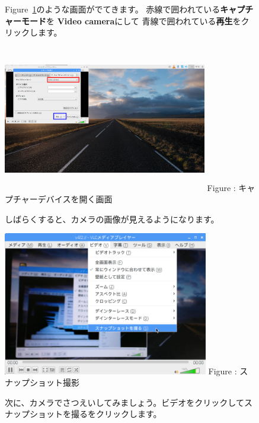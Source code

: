 \documentclass[a4paper,12pt]{jarticle}
\begin{document}
\begin{figure}[ht]
  Figure~\ref{seq:refFigure23}のような画面がでてきます。
  赤線で囲われている\textbf{キャプチャーモード}を
  \textbf{Video camera}にして
  青線で囲われている\textbf{再生}をクリックします。


  \centering
  \begin{minipage}{9.119cm}
    \includegraphics[width=8.915cm,height=6.426cm]{textbook-img117.png}
    Figure {\theFigure\label{seq:refFigure23}}:
    キャプチャーデバイスを開く画面
  \end{minipage}

  \flushleft
  しばらくすると、カメラの画像が見えるようになります。

  \centering
  \begin{minipage}{9.125cm}
    {\upshape
      \includegraphics[width=8.966cm,height=6.274cm]{textbook-img118.png}
      \newline
      Figure : スナップショット撮影}
  \end{minipage}
  \flushleft

  次に、カメラでさつえいしてみましょう。ビデオをクリックしてスナップショットを撮るをクリックします。



\end{figure}
\end{document}
